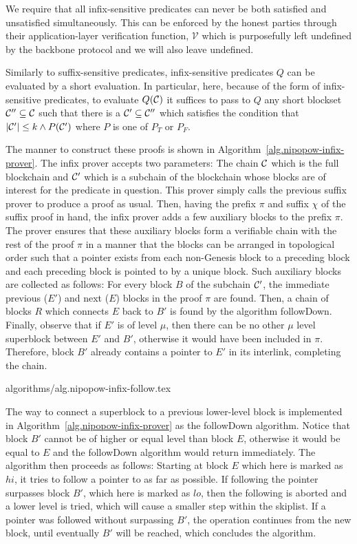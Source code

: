 We require that all infix-sensitive predicates can never be both satisfied and
unsatisfied simultaneously. This can be enforced by the honest parties through
their application-layer verification function, $\mathcal{V}$ which is
purposefully left undefined by the backbone protocol and we will also leave
undefined.

Similarly to suffix-sensitive predicates, infix-sensitive predicates $Q$ can be
evaluated by a short evaluation. In particular, here, because of the form of
infix-sensitive predicates, to evaluate $Q(\mathcal{C})$ it suffices to pass to $Q$
any short blockset $\mathcal{C}'' \subseteq \mathcal{C}$ such that there is a $\mathcal{C}'
\subseteq \mathcal{C}''$ which satisfies the condition that $|\mathcal{C}'| \leq k \land
P(\mathcal{C}')$ where $P$ is one of $P_T$ or $P_F$.

The manner to construct these proofs is shown in
Algorithm~\ref{alg.nipopow-infix-prover}. The infix prover accepts two
parameters: The chain $\mathcal{C}$ which is the full blockchain and $\mathcal{C}'$ which
is a subchain of the blockchain whose blocks are of interest for the predicate
in question. This prover simply calls the previous suffix prover to produce a
proof as usual. Then, having the prefix $\pi$ and suffix $\chi$ of the suffix
proof in hand, the infix prover adds a few auxiliary blocks to the prefix
$\pi$. The prover ensures that these auxiliary blocks form a verifiable chain
with the rest of the proof $\pi$ in a manner that the blocks can be arranged in
topological order such that a pointer exists from each non-Genesis block to a
preceding block and each preceding block is pointed to by a unique block.
Such auxiliary blocks are collected as follows: For every block $B$ of the
subchain $\mathcal{C}'$, the immediate previous ($E'$) and next ($E$) blocks in the
proof $\pi$ are found. Then, a chain of blocks $R$ which connects $E$ back to
$B'$ is found by the algorithm followDown. Finally, observe that if $E'$ is of
level $\mu$, then there can be no other $\mu$ level superblock between $E'$ and
$B'$, otherwise it would have been included in $\pi$. Therefore, block $B'$
already contains a pointer to $E'$ in its interlink, completing the chain.

{algorithms/alg.nipopow-infix-follow.tex}

The way to connect a superblock to a previous lower-level block is implemented
in Algorithm~\ref{alg.nipopow-infix-prover} as the followDown algorithm. Notice
that block $B'$ cannot be of higher or equal level than block $E$, otherwise it
would be equal to $E$ and the followDown algorithm would return immediately.
The algorithm then proceeds as follows: Starting at block $E$ which here is
marked as $hi$, it tries to follow a pointer to as far as possible. If
following the pointer surpasses block $B'$, which here is marked as $lo$, then
the following is aborted and a lower level is tried, which will cause a smaller
step within the skiplist. If a pointer was followed without surpassing $B'$,
the operation continues from the new block, until eventually $B'$ will be
reached, which concludes the algorithm.

